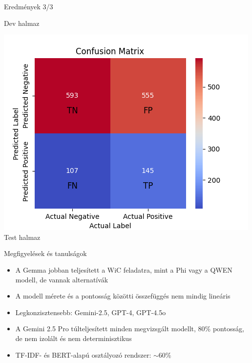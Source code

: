 \documentclass{beamer}
\begin{document}
\begin{frame}{Eredmények 3/3}
{\begin{minipage}{0.32\linewidth}
            \small Dev halmaz
        \end{minipage}
        \begin{minipage}{0.32\linewidth}
            \centering
            \includegraphics[width=\linewidth]{graphics/WiC_confusion_matrix_abra.test.png}\\
            \small Test halmaz
        \end{minipage}

        \vspace{0.25cm}
        \label{fig:enter-label5}
    }
    \end{frame}



    \begin{frame}{Megfigyelések és tanulságok}
        \begin{itemize}
            \item A Gemma jobban teljesített a WiC feladatra, mint a Phi vagy a QWEN modell, de vannak alternatívák
            \item A modell mérete és a pontosság közötti összefüggés nem mindig lineáris
            \item Legkonzisztensebb: Gemini-2.5, GPT-4, GPT-4.5o
            \item A Gemini 2.5 Pro túlteljesített minden megvizsgált modellt, 80\% pontosság, de nem izolált és nem determinisztikus
            \item TF-IDF- és BERT-alapú osztályozó rendszer: $\sim60$\%
        \end{itemize}
    \end{frame}
\end{document}
